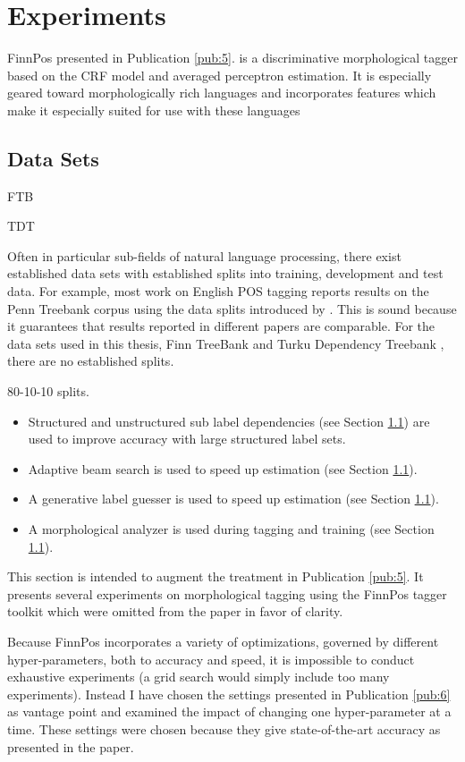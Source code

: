 \chapter{Experiments}
\label{chapter:finnpos}

FinnPos presented in Publication \ref{pub:5}.  is a discriminative morphological
tagger based on the CRF model and averaged perceptron estimation. It
is especially geared toward morphologically rich languages and
incorporates features which make it especially suited for use
with these languages

\section{Data Sets}
FTB

TDT

Often in particular sub-fields of natural language processing, there
exist established data sets with established splits into training,
development and test data. For example, most work on English POS
tagging reports results on the Penn Treebank corpus \citep{Marcus1993}
using the data splits introduced by \cite{Collins2002}. This is sound
because it guarantees that results reported in different papers are
comparable. For the data sets used in this thesis, Finn TreeBank
\citep{Voutilainen2011} and Turku Dependency Treebank
\citep{Haverinen2013}, there are no established splits. 

80-10-10 splits.

\begin{itemize}
\item Structured and unstructured sub label dependencies (see Section \ref{}) are used to improve accuracy with large structured label sets.
\item Adaptive beam search is used to speed up estimation (see Section \ref{}).
\item A generative label guesser is used to speed up estimation (see Section \ref{}).
\item A morphological analyzer is used during tagging and training (see Section \ref{}).
\end{itemize}

This section is intended to augment the treatment
in Publication \ref{pub:5}. It presents several experiments on
morphological tagging using the FinnPos tagger toolkit which were
omitted from the paper in favor of clarity.

Because FinnPos incorporates a variety of optimizations, governed by
different hyper-parameters, both to accuracy and speed, it is
impossible to conduct exhaustive experiments (a grid search would
simply include too many experiments). Instead I have chosen the
settings presented in Publication \ref{pub:6} as vantage point and
examined the impact of changing one hyper-parameter at a time. These
settings were chosen because they give state-of-the-art accuracy as
presented in the paper. 

